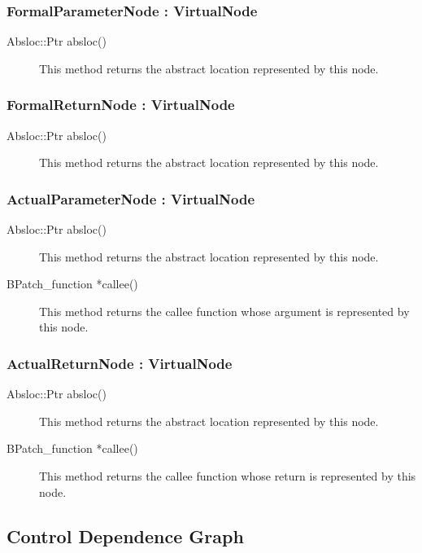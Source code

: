 \documentclass[12pt,titlepage]{article}
\begin{document}
\subsubsection{FormalParameterNode : VirtualNode}
\begin{description}
\item[Absloc::Ptr absloc()]
This method returns the abstract location represented by this node. 
\end{description}

\subsubsection{FormalReturnNode : VirtualNode}
\begin{description}
\item[Absloc::Ptr absloc()]
This method returns the abstract location represented by this node.
\end{description}

\subsubsection{ActualParameterNode : VirtualNode}
\begin{description}
\item[Absloc::Ptr absloc()]
This method returns the abstract location represented by this node.
\item[BPatch\_function *callee() ]
This method returns the callee function whose argument is represented by this node.
\end{description}

\subsubsection{ActualReturnNode : VirtualNode}
\begin{description}
\item[Absloc::Ptr absloc()]
This method returns the abstract location represented by this node.
\item[BPatch\_function *callee() ]
This method returns the callee function whose return is represented by this node.
\end{description}

\subsection{Control Dependence Graph}
\end{document}
